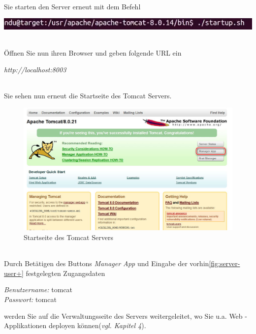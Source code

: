 \documentclass[a4paper, 12pt]{scrreprt}
\begin{document}
\ \\
Sie starten den Server erneut mit dem Befehl
\begin{center}
	\includegraphics[width=0.8\linewidth]{Grafiken/Tomcat_starten_linux}
\end{center}
\ \\
Öffnen Sie nun ihren Browser und geben folgende URL ein
\begin{center}
	{\it http://localhost:8003}
\end{center}
\ \\
Sie sehen nun erneut die Startseite des Tomcat Servers.
\begin{figure}[h]
	\centering
	\includegraphics[width=0.8\linewidth]{Grafiken/ServerStartPage}
	\caption{Startseite des Tomcat Servers}
	\label{fig:ServerStartPage12}
\end{figure}
\ \\
Durch Betätigen des Buttons {\it Manager App} und Eingabe der vorhin\ref{fig:server-user+} festgelegten Zugangsdaten
\begin{center}
	{\it Benutzername:} tomcat \\
	{\it Passwort:} tomcat 
\end{center} werden Sie auf die Verwaltungsseite des Servers weitergeleitet, wo Sie u.a. Web - Applikationen deployen können({\it vgl. Kapitel 4}).
\end{document}
